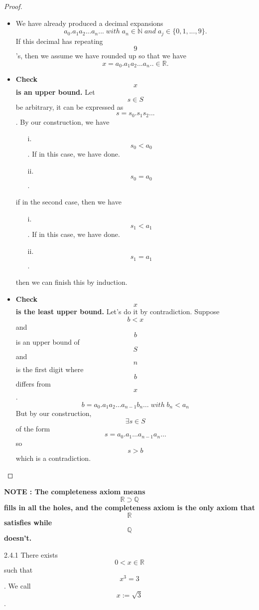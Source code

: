 \documentclass[a4paper]{article}
\def\rr{{\mathbb R}}
\def\qq{{\mathbb Q}}
\def\nn{{\mathbb N}}
\begin{document}
\begin{proof}
\begin{itemize}
        \item We have already produced a decimal expansions
            \begin{equation*}
                a_0.a_1a_2...a_n... \; with \; a_n\in \nn \; and \; a_j\in \{0,1,...,9\}.
            \end{equation*}
            If this decimal has repeating $$9$$'s, then we assume we have rounded up so that we have
            \begin{equation*}
                x=a_0.a_1a_2...a_n..\in \rr.
            \end{equation*}
        \item \textbf{Check $$x$$ is an upper bound.} Let $$s\in S$$ be arbitrary, it can be expressed as $$s=s_0.s_1s_2...$$. By our construction, we have
         \begin{enumerate}
            \item[i.] $$s_0<a_0$$. If in this case, we have done.
            \item[ii.] $$s_0=a_0$$.
         \end{enumerate}
         if in the second case, then we have
         \begin{enumerate}
            \item[i.] $$s_1<a_1$$. If in this case, we have done.
            \item[ii.] $$s_1=a_1$$. 
         \end{enumerate}
         then we can finish this by induction.
        \item \textbf{Check $$x$$ is the least upper bound.} Let's do it by contradiction. Suppose $$b<x$$ and $$b$$ is an upper bound of $$S$$ and $$n$$ is the first digit where $$b$$ differs from $$x$$.
              \begin{equation*}
                b=a_0.a_1a_2\ldots a_{n-1}b_n\ldots \; with \; b_n<a_n
              \end{equation*}
        But by our construction, $$\exists s\in S$$ of the form $$s=a_0.a_1\ldots a_{n-1}a_n\ldots $$ so $$s>b$$ which is a contradiction.
    \end{itemize}
\end{proof}
\textbf{NOTE : The completeness axiom means $$\rr \supset \qq$$ fills in all the holes, and the completeness axiom is the only axiom that $$\rr$$ satisfies while $$\qq$$ doesn't.} 
\begin{proposition}{2.4.1}{}
    There exists $$0<x\in \mathbb{R}$$ such that $$x^3=3$$. We call $$x:=\sqrt{3}$$.
\end{proposition}
\end{document}
